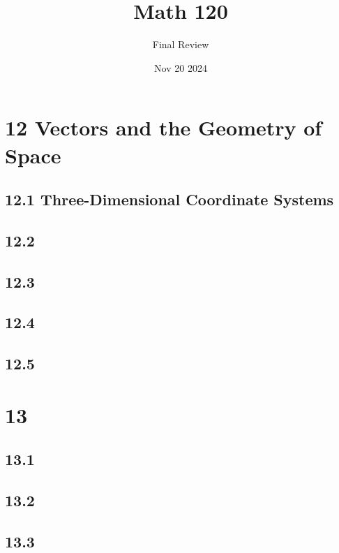 \documentclass{report}
\title{\Huge{Math 120}}
\author{\huge{Final Review}}
\date{Nov 20 2024}
\begin{document}
\maketitle
\newpage%
\tableofcontents
\pagebreak

\chapter*{12 Vectors and the Geometry of Space}

\section*{12.1 Three-Dimensional Coordinate Systems}


\section*{12.2}

\section*{12.3}

\section*{12.4}

\section*{12.5}

\chapter*{13}

\section*{13.1}

\section*{13.2}

\section*{13.3}
\end{document}
